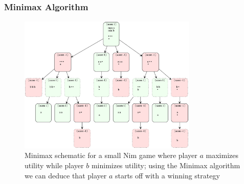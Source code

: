 \documentclass{beamer}
\begin{document}
\subsection{}
\begin{framefont}{\footnotesize}
  \begin{frame}
    \frametitle{Minimax Algorithm}
    \begin{figure}
      \centering
      \includegraphics[trim={0cm -0.5cm 0cm 0cm},clip,width=8.5cm]{tree-minmax.png}
      \caption{Minimax schematic for a small Nim game where player $a$ maximizes utility while player $b$ minimizes utility; using the Minimax algorithm we can deduce that player $a$ starts off with a winning strategy}
    \end{figure}
  \end{frame}
\end{framefont}
\end{document}
